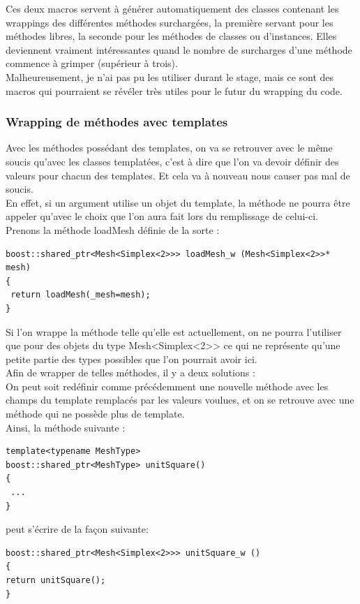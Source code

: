 \documentclass[french,12pt]{article}
\begin{document}
Ces deux macros servent à générer automatiquement des classes contenant les wrappings des différentes méthodes surchargées, la première servant pour les méthodes libres, la seconde pour les méthodes de classes ou d'instances. Elles deviennent vraiment intéressantes quand le nombre de surcharges d'une méthode commence à grimper (supérieur à trois).\\

Malheureusement, je n'ai pas pu les utiliser durant le stage, mais ce sont des macros qui pourraient se révéler très utiles pour le futur du wrapping du code.

\subsubsection{Wrapping de méthodes avec templates}

Avec les méthodes possédant des templates, on va se retrouver avec le même soucis qu'avec les classes templatées, c'est à dire que l'on va devoir définir des valeurs pour chacun des templates. Et cela va à nouveau nous causer pas mal de soucis.\\

En effet, si un argument utilise un objet du template, la méthode ne pourra être appeler qu'avec le choix que l'on aura fait lors du remplissage de celui-ci.\\

Prenons la méthode loadMesh définie de la sorte :
\begin{lstlisting}
boost::shared_ptr<Mesh<Simplex<2>>> loadMesh_w (Mesh<Simplex<2>>* mesh)
{
 return loadMesh(_mesh=mesh);
}
\end{lstlisting}

Si l'on wrappe la méthode telle qu'elle est actuellement, on ne pourra l'utiliser que pour des objets du type Mesh<Simplex<2>> ce qui ne représente qu'une petite partie des types possibles que l'on pourrait avoir ici.\\

Afin de wrapper de telles méthodes, il y a deux solutions :\\

On peut soit redéfinir comme précédemment une nouvelle méthode avec les champs du template remplacés par les valeurs voulues, et on se retrouve avec une méthode qui ne possède plus de template.\\
Ainsi, la méthode suivante :
\begin{lstlisting}
template<typename MeshType>
boost::shared_ptr<MeshType> unitSquare()
{
 ...
}
\end{lstlisting}
peut s'écrire de la façon suivante:
\begin{lstlisting}
boost::shared_ptr<Mesh<Simplex<2>>> unitSquare_w ()
{
return unitSquare();
}
\end{lstlisting}
\end{document}
